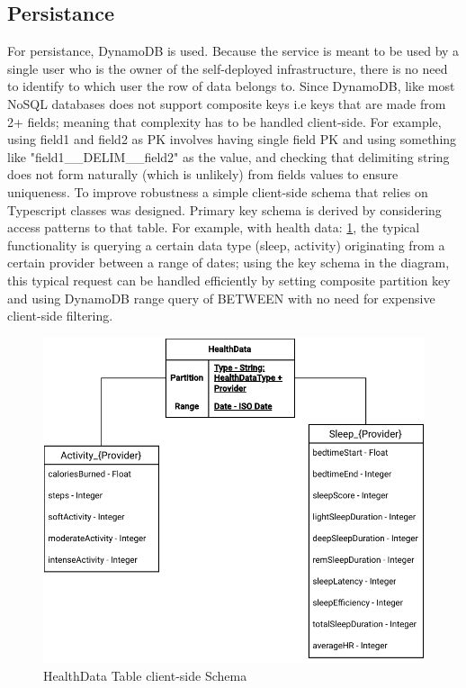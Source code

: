 \subsection{Persistance}
For persistance, DynamoDB is used. Because the service is meant to be used by a single user who is the owner of the self-deployed infrastructure, there is no need to identify to which user the row of data belongs to. Since DynamoDB, like most NoSQL databases does not support composite keys i.e keys that are made from 2+ fields; meaning that complexity has to be handled client-side. For example, using field1 and field2 as PK involves having single field PK and using something like "field1\_\_DELIM\_\_field2" as the value, and checking that delimiting string does not form naturally (which is unlikely) from fields values to ensure uniqueness. To improve robustness a simple client-side schema that relies on Typescript classes was designed. Primary key schema is derived by considering access patterns to that table. For example, with health data: \ref{fig:schema}, the typical functionality is querying a certain data type (sleep, activity) originating from a certain provider between a range of dates; using the key schema in the diagram, this typical request can be handled efficiently by setting composite partition key and using DynamoDB range query of BETWEEN with no need for expensive client-side filtering. 
\begin{figure}
    
    \centering
    \includegraphics[width=\textwidth,height=\textheight,keepaspectratio]{../images/dataSchema.pdf}
    \caption{HealthData Table client-side Schema}
    \label{fig:schema}
    
\end{figure}
